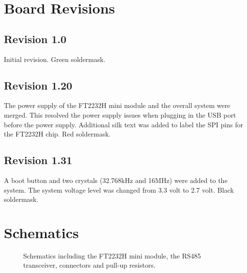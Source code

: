 \documentclass[a4paper]{report}
\begin{document}
\section{Board Revisions}
\subsection{Revision 1.0}
Initial revision.
Green soldermask.
\subsection{Revision 1.20}
The power supply of the FT2232H mini module and the overall system were merged. 
This resolved the power supply issues when plugging in the USB port before the power supply. 
Additional silk text was added to label the SPI pins for the FT2232H chip.
Red soldermask.
\subsection{Revision 1.31}
A boot button and two crystals (32.768kHz and 16MHz) were added to the system.
The system voltage level was changed from 3.3 volt to 2.7 volt.
Black soldermask.
\section{Schematics}
\begin{figure}[ht] 
  \centering
  {
   \setlength{\fboxsep}{0pt}
   \setlength{\fboxrule}{0pt}
  }
  \caption{Schematics including the FT2232H mini module, the RS485 transceiver, connectors and pull-up resistors.}
  \label{fig:ft2232_schematic}
\end{figure}
\end{document}
